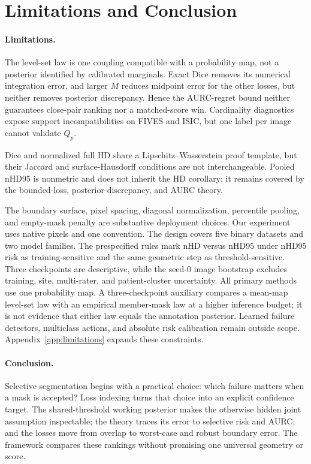 \section{Limitations and Conclusion}
\label{sec:limitations}
\label{sec:limitations-conclusion}

\paragraph{Limitations.}
The level-set law is one coupling compatible with a probability map, not a
posterior identified by calibrated marginals. Exact Dice removes its numerical
integration error, and larger \(M\) reduces midpoint error for the other losses,
but neither removes posterior discrepancy. Hence the AURC-regret bound neither
guarantees close-pair ranking nor a matched-score win. Cardinality diagnostics
expose support incompatibilities on FIVES and ISIC, but one label per image
cannot validate \(Q_p\).

Dice and normalized full HD share a Lipschitz--Wasserstein proof template, but
their Jaccard and surface-Hausdorff conditions are not interchangeable. Pooled
nHD95 is nonmetric and does not inherit the HD corollary; it remains covered by
the bounded-loss, posterior-discrepancy, and AURC theory.

The boundary surface, pixel spacing, diagonal normalization, percentile pooling,
and empty-mask penalty are substantive deployment choices. Our experiment uses
native pixels and one convention. The design covers five binary datasets and two
model families. The prespecified rules mark nHD versus nHD95 under nHD95 risk as
training-sensitive and the same geometric step as threshold-sensitive. Three
checkpoints are descriptive, while the seed-0 image bootstrap excludes training,
site, multi-rater, and patient-cluster uncertainty. All primary methods use one
probability map. A three-checkpoint auxiliary compares a mean-map level-set law
with an empirical member-mask law at a higher inference budget; it is not
evidence that either law equals the annotation posterior. Learned failure
detectors, multiclass actions, and absolute risk calibration remain outside
scope.
Appendix~\ref{app:limitations} expands these constraints.

\paragraph{Conclusion.}
\label{sec:conclusion}
Selective segmentation begins with a practical choice: which failure matters
when a mask is accepted? Loss indexing turns that choice into an explicit
confidence target. The shared-threshold working posterior makes the otherwise
hidden joint assumption inspectable; the theory traces its error to selective
risk and AURC; and the losses move from overlap to worst-case and robust boundary
error. The framework compares these rankings without promising one universal
geometry or score.
